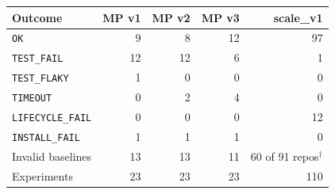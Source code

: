 \begin{tabular}{lrrrr}
\toprule
Outcome & MP v1 & MP v2 & MP v3 & scale\_v1 \\
\midrule
\texttt{OK} & 9 & 8 & 12 & 97 \\
\texttt{TEST\_FAIL} & 12 & 12 & 6 & 1 \\
\texttt{TEST\_FLAKY} & 1 & 0 & 0 & 0 \\
\texttt{TIMEOUT} & 0 & 2 & 4 & 0 \\
\texttt{LIFECYCLE\_FAIL} & 0 & 0 & 0 & 12 \\
\texttt{INSTALL\_FAIL} & 1 & 1 & 1 & 0 \\
\midrule
Invalid baselines & 13 & 13 & 11 & 60 of 91 repos$^\dagger$ \\
Experiments & 23 & 23 & 23 & 110 \\
\bottomrule
\end{tabular}
